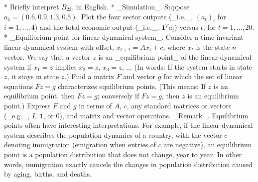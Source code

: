* Briefly interpret \(B_{23}\), in English.
* _Simulation_. Suppose \(a_{1}=(0.6,0.9,1.3,0.5)\). Plot the four sector outputs (_i.e._, \((a_{t})_{i}\) for \(i=1,\ldots,4\)) and the total economic output (_i.e._, \(\mathbf{1}^{T}a_{t}\)) versus \(t\), for \(t=1,\ldots,20\).
* _Equilibrium point for linear dynamical system_. Consider a time-invariant linear dynamical system with offset, \(x_{t+1}=Ax_{t}+c\), where \(x_{t}\) is the state \(n\)-vector. We say that a vector \(z\) is an _equilibrium point_ of the linear dynamical system if \(x_{1}=z\) implies \(x_{2}=z\), \(x_{3}=z\), ... (In words: If the system starts in state \(z\), it stays in state \(z\).) Find a matrix \(F\) and vector \(g\) for which the set of linear equations \(Fz=g\) characterizes equilibrium points. (This means: If \(z\) is an equilibrium point, then \(Fz=g\); conversely if \(Fz=g\), then \(z\) is an equilibrium point.) Express \(F\) and \(g\) in terms of \(A\), \(c\), any standard matrices or vectors (_e.g._, \(I\), \(\mathbf{1}\), or \(0\)), and matrix and vector operations. _Remark_. Equilibrium points often have interesting interpretations. For example, if the linear dynamical system describes the population dynamics of a country, with the vector \(c\) denoting immigration (emigration when entries of \(c\) are negative), an equilibrium point is a population distribution that does not change, year to year. In other words, immigration exactly cancels the changes in population distribution caused by aging, births, and deaths.

